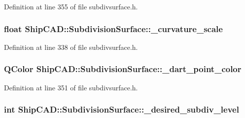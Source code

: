 Definition at line 355 of file subdivsurface.\-h.

\hypertarget{classShipCAD_1_1SubdivisionSurface_acf241b41a8ca897306decbbab8e44c69}{
\subsubsection[{\-\_\-curvature\-\_\-scale}]{\setlength{\rightskip}{0pt plus 5cm}float Ship\-C\-A\-D\-::\-Subdivision\-Surface\-::\-\_\-curvature\-\_\-scale\hspace{0.3cm}{\ttfamily [protected]}}}\label{classShipCAD_1_1SubdivisionSurface_acf241b41a8ca897306decbbab8e44c69}


Definition at line 338 of file subdivsurface.\-h.

\hypertarget{classShipCAD_1_1SubdivisionSurface_a45054fd2d0065a342828bcd675e91307}{
\subsubsection[{\-\_\-dart\-\_\-point\-\_\-color}]{\setlength{\rightskip}{0pt plus 5cm}Q\-Color Ship\-C\-A\-D\-::\-Subdivision\-Surface\-::\-\_\-dart\-\_\-point\-\_\-color\hspace{0.3cm}{\ttfamily [protected]}}}\label{classShipCAD_1_1SubdivisionSurface_a45054fd2d0065a342828bcd675e91307}


Definition at line 351 of file subdivsurface.\-h.

\hypertarget{classShipCAD_1_1SubdivisionSurface_aeec20f09be87e6d57d88f903853ca96f}{
\subsubsection[{\-\_\-desired\-\_\-subdiv\-\_\-level}]{\setlength{\rightskip}{0pt plus 5cm}int Ship\-C\-A\-D\-::\-Subdivision\-Surface\-::\-\_\-desired\-\_\-subdiv\-\_\-level\hspace{0.3cm}{\ttfamily [protected]}}}\label{classShipCAD_1_1SubdivisionSurface_aeec20f09be87e6d57d88f903853ca96f}


